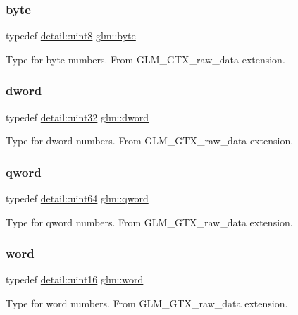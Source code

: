 \subsubsection{\texorpdfstring{byte}{byte}}
{\footnotesize\ttfamily typedef \mbox{\hyperlink{namespaceglm_1_1detail_aef2588f97d090cc19fbbe0c74fe17c8f}{detail\+::uint8}} \mbox{\hyperlink{group__gtx__raw__data_gacd7fe1f2ad60a57f7d7ad4f1e6836efd}{glm\+::byte}}}

Type for byte numbers. From G\+L\+M\+\_\+\+G\+T\+X\+\_\+raw\+\_\+data extension. \mbox{\label{group__gtx__raw__data_ga1fc2589df6d44e923cd1820cf14805cf}} 
\subsubsection{\texorpdfstring{dword}{dword}}
{\footnotesize\ttfamily typedef \mbox{\hyperlink{namespaceglm_1_1detail_ade6cfbf377022aaa391af8cd50489222}{detail\+::uint32}} \mbox{\hyperlink{group__gtx__raw__data_ga1fc2589df6d44e923cd1820cf14805cf}{glm\+::dword}}}

Type for dword numbers. From G\+L\+M\+\_\+\+G\+T\+X\+\_\+raw\+\_\+data extension. \mbox{\label{group__gtx__raw__data_ga32447af289e879589883c9b7e3be1246}} 
\subsubsection{\texorpdfstring{qword}{qword}}
{\footnotesize\ttfamily typedef \mbox{\hyperlink{namespaceglm_1_1detail_adec4b19bf4982125e122db2fe03c5810}{detail\+::uint64}} \mbox{\hyperlink{group__gtx__raw__data_ga32447af289e879589883c9b7e3be1246}{glm\+::qword}}}

Type for qword numbers. From G\+L\+M\+\_\+\+G\+T\+X\+\_\+raw\+\_\+data extension. \mbox{\label{group__gtx__raw__data_ga5617a479d471021b5c773c5e969ba46d}} 
\subsubsection{\texorpdfstring{word}{word}}
{\footnotesize\ttfamily typedef \mbox{\hyperlink{namespaceglm_1_1detail_a47b2a7d006d187338e8031a352d1ce56}{detail\+::uint16}} \mbox{\hyperlink{group__gtx__raw__data_ga5617a479d471021b5c773c5e969ba46d}{glm\+::word}}}

Type for word numbers. From G\+L\+M\+\_\+\+G\+T\+X\+\_\+raw\+\_\+data extension. 